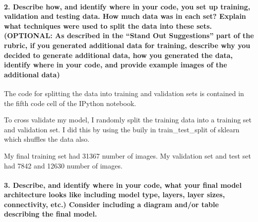 \documentclass[11pt]{article}
\begin{document}
\paragraph{\texorpdfstring{2. Describe how, and identify where in your
code, you set up training, validation and testing data. How much data
was in each set? Explain what techniques were used to split the data
into these sets. (OPTIONAL: As described in the ``Stand Out
Suggestions'' part of the rubric, if you generated additional data for
training, describe why you decided to generate additional data, how you
generated the data, identify where in your code, and provide example
images of the additional
data)}{2. Describe how, and identify where in your code, you set up training, validation and testing data. How much data was in each set? Explain what techniques were used to split the data into these sets. (OPTIONAL: As described in the Stand Out Suggestions part of the rubric, if you generated additional data for training, describe why you decided to generate additional data, how you generated the data, identify where in your code, and provide example images of the additional data)}}\label{describe-how-and-identify-where-in-your-code-you-set-up-training-validation-and-testing-data.-how-much-data-was-in-each-set-explain-what-techniques-were-used-to-split-the-data-into-these-sets.-optional-as-described-in-the-stand-out-suggestions-part-of-the-rubric-if-you-generated-additional-data-for-training-describe-why-you-decided-to-generate-additional-data-how-you-generated-the-data-identify-where-in-your-code-and-provide-example-images-of-the-additional-data}

The code for splitting the data into training and validation sets is
contained in the fifth code cell of the IPython notebook.

To cross validate my model, I randomly split the training data into a
training set and validation set. I did this by using the buily in
train\_test\_split of sklearn which shuffles the data also.

My final training set had 31367 number of images. My validation set and
test set had 7842 and 12630 number of images.

\paragraph{3. Describe, and identify where in your code, what your final
model architecture looks like including model type, layers, layer sizes,
connectivity, etc.) Consider including a diagram and/or table describing
the final
model.}\label{describe-and-identify-where-in-your-code-what-your-final-model-architecture-looks-like-including-model-type-layers-layer-sizes-connectivity-etc.-consider-including-a-diagram-andor-table-describing-the-final-model.}
\end{document}
